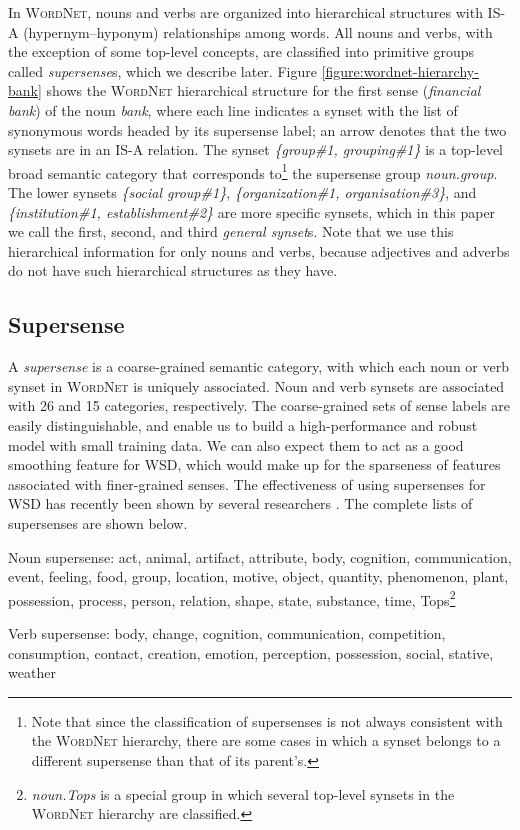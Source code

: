 \documentclass[english]{jnlp_1.4}
\begin{document}
In \textsc{WordNet}, nouns and verbs are organized into hierarchical structures with IS-A (hypernym--hyponym) relationships among words.
All nouns and verbs, with the exception of some top-level concepts, are classified into primitive groups called \textit{supersense}s, which we describe later.
Figure \ref{figure:wordnet-hierarchy-bank} shows the \textsc{WordNet} hierarchical structure for the first sense (\textit{financial bank}) of the noun \textit{bank}, where each line indicates a synset with the list of synonymous words headed by its supersense label; an arrow denotes that the two synsets are in an IS-A relation.
The synset \textit{\{group\#1, grouping\#1\}} is a top-level broad semantic category that corresponds to\footnote{Note that since the classification of supersenses is not always consistent with the \textsc{WordNet} hierarchy, there are some cases in which a synset belongs to a different supersense than that of its parent's.} the supersense group \textit{noun.group}.
The lower synsets \textit{\{social group\#1\}}, \textit{\{organization\#1, organisation\#3\}}, and \textit{\{institution\#1, establishment\#2\}} are more specific synsets, which in this paper we call the first, second, and third \textit{general synset}s.
Note that we use this hierarchical information for only nouns and verbs, because adjectives and adverbs do not have such hierarchical structures as they have.


\subsection{Supersense}
\label{section:supersense}

A \textit{supersense} \cite{ciaramita:2003} is a coarse-grained semantic category, with which each noun or verb synset in \textsc{WordNet} is uniquely associated.
Noun and verb synsets are associated with 26 and 15 categories, respectively.
The coarse-grained sets of sense labels are easily distinguishable, and enable us to build a high-performance and robust model with small training data.
We can also expect them to act as a good smoothing feature for WSD,
which would make up for the sparseness of features associated with finer-grained senses. 
The effectiveness of using supersenses for WSD has recently been shown by several researchers \cite{kohomban:2005,ciaramita:2006,mihalcea:2007}.
The complete lists of supersenses are shown below.

\begin{description}
\item{Noun supersense: }
act, animal, artifact, attribute, body, cognition, communication, event, feeling, food, group, location, motive, object, quantity, phenomenon, plant, possession, process, person, relation, shape, state, substance, time, Tops\footnote{\textit{noun.Tops} is a special group in which several top-level synsets in the \textsc{WordNet} hierarchy are classified.}
\item{Verb supersense: }
body, change, cognition, communication, competition, consumption, contact, creation, emotion, perception, possession, social, stative, weather
\end{description}
\end{document}
